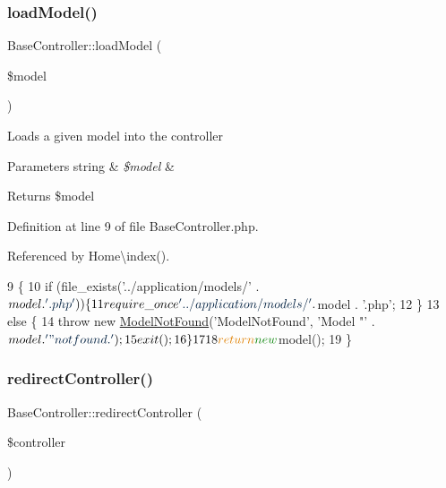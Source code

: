 \subsubsection{\texorpdfstring{load\+Model()}{loadModel()}}
{\footnotesize\ttfamily Base\+Controller\+::load\+Model (\begin{DoxyParamCaption}\item[{}]{\$model }\end{DoxyParamCaption})\hspace{0.3cm}{\ttfamily [protected]}}

Loads a given model into the controller


\begin{DoxyParams}[1]{Parameters}
string & {\em \$model} & \\
\hline
\end{DoxyParams}
\begin{DoxyReturn}{Returns}
\$model 
\end{DoxyReturn}


Definition at line 9 of file Base\+Controller.\+php.



Referenced by Home\textbackslash{}index().


\begin{DoxyCode}
9                                          \{
10         \textcolor{keywordflow}{if} (file\_exists(\textcolor{stringliteral}{'../application/models/'} . $model . \textcolor{stringliteral}{'.php'})) \{
11             require\_once \textcolor{stringliteral}{'../application/models/'} . $model . \textcolor{stringliteral}{'.php'};
12         \}
13         \textcolor{keywordflow}{else} \{
14             \textcolor{keywordflow}{throw} \textcolor{keyword}{new} \hyperlink{class_model_not_found}{ModelNotFound}(\textcolor{stringliteral}{'ModelNotFound'}, \textcolor{stringliteral}{'Model "'} . $model . \textcolor{stringliteral}{'" not found.'});
15             exit();
16         \}
17 
18         \textcolor{keywordflow}{return} \textcolor{keyword}{new} $model();
19     \}
\end{DoxyCode}
\hypertarget{class_base_controller_ad16dba8468d26e5ec0f30a415af257c0}{}\label{class_base_controller_ad16dba8468d26e5ec0f30a415af257c0} 
\subsubsection{\texorpdfstring{redirect\+Controller()}{redirectController()}}
{\footnotesize\ttfamily Base\+Controller\+::redirect\+Controller (\begin{DoxyParamCaption}\item[{}]{\$controller }\end{DoxyParamCaption})\hspace{0.3cm}{\ttfamily [protected]}}

